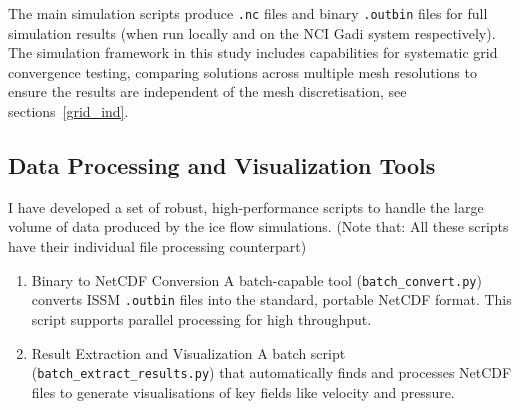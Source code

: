 



The main simulation scripts produce \texttt{.nc} files and binary \texttt{.outbin} files for full simulation results (when run locally and on the NCI Gadi system respectively).
The simulation framework in this study includes capabilities for systematic grid convergence testing, comparing solutions across multiple mesh resolutions to ensure the results are independent of the mesh discretisation, see sections~\ref{grid_ind}.

\subsection{Data Processing and Visualization Tools}\label{dataviz}
I have developed a set of robust, high-performance scripts to handle the large volume of data produced by the ice flow simulations. (Note that: All these scripts have their individual file processing counterpart)

\begin{enumerate}
\item{Binary to NetCDF Conversion} A batch-capable tool (\texttt{batch\_convert.py}) converts ISSM \texttt{.outbin} files into the standard, portable NetCDF format. This script supports parallel processing for high throughput.
\item{Result Extraction and Visualization} A batch script (\texttt{batch\_extract\_results.py}) that automatically finds and processes NetCDF files to generate visualisations of key fields like velocity and pressure. 
\end{enumerate}




